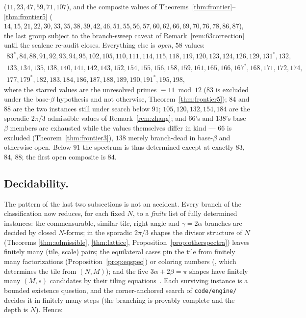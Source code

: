 \documentclass[11pt,reqno]{amsart}
\theoremstyle{plain}
\theoremstyle{definition}
\begin{document}
($11,23,47,59,71,107$), and the composite values of
Theorems~\ref{thm:frontier}--\ref{thm:frontier5}
($14,15,21,22,30,33,35,38,39,42,46,51,55,56,57,60,62,66,69,70,76,78,86,87$), the last group
subject to the branch-sweep caveat of Remark~\ref{rem:63correction} until the scalene re-audit
closes. Everything else is \emph{open}, $58$ values:
\[
\begin{array}{l}
83^{*},84,88,91,92,93,94,95,102,105,110,111,114,115,118,119,120,123,124,126,129,131^{*},132,\\
133,134,135,138,140,141,142,143,152,154,155,156,158,159,161,165,166,167^{*},168,171,172,174,\\
177,179^{*},182,183,184,186,187,188,189,190,191^{*},195,198,
\end{array}
\]
where the starred values are the unresolved primes $\equiv11\bmod{12}$ ($83$ is excluded under
the base-$\beta$ hypothesis and not otherwise, Theorem~\ref{thm:frontier5}); $84$ and $88$ are
the two instances still under search below $91$; $105,120,132,154,184$ are the sporadic
$2\pi/3$-admissible values of Remark~\ref{rem:zhang}; and $66$'s and $138$'s base-$\beta$ members
are exhausted while the values themselves differ in kind --- $66$ is excluded
(Theorem~\ref{thm:frontier3}), $138$ merely branch-dead in base-$\beta$ and otherwise open.
Below $91$ the spectrum is thus determined except at exactly $83$, $84$, $88$; the first open
composite is $84$.

\subsection*{Decidability.}
The pattern of the last two subsections is not an accident. Every branch of the classification now
reduces, for each fixed $N$, to a \emph{finite} list of fully determined instances: the
commensurable, similar-tile, right-angle and $\gamma=2\alpha$ branches are decided by closed
$N$-forms; in the sporadic $2\pi/3$ shapes the divisor structure of $N$ (Theorems
\ref{thm:admissible}, \ref{thm:lattice}, Proposition~\ref{prop:otherspectra}) leaves finitely
many (tile, scale) pairs; the equilateral cases pin the tile from finitely many factorizations
(Proposition~\ref{prop:eqspec}) or coloring numbers (\cite[Thm.~2]{BeesonEq}, which determines
the tile from $(N,M)$); and the five $3\alpha+2\beta=\pi$ shapes have finitely many $(M,s)$
candidates by their tiling equations~\cite{BeesonIII}. Each surviving instance is a bounded
existence question, and the corner-anchored search of \texttt{code/engine/} decides it in
finitely many steps (the branching is provably complete and the depth is $N$). Hence:
\end{document}
